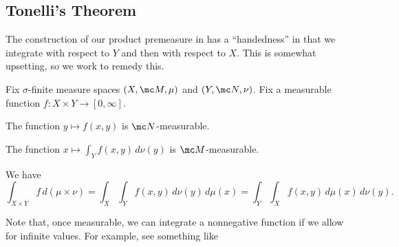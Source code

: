\documentclass[../notes.tex]{subfiles}
\begin{document}
\subsection{Tonelli's Theorem}
The construction of our product premeasure in  has a ``handedness'' in that we integrate with respect to $Y$ and then with respect to $X$. This is somewhat upsetting, so we work to remedy this.
\begin{theorem}[Tonelli]
	Fix $\sigma$-finite measure spaces $(X,\mc M,\mu)$ and $(Y,\mc N,\nu)$. Fix a measurable function $f\colon X\times Y\to[0,\infty]$.
	\begin{listalph}
		\item The function $y\mapsto f(x,y)$ is $\mc N$-measurable.
		\item The function $x\mapsto\int_Yf(x,y)\,d\nu(y)$ is $\mc M$-measurable.
		\item We have
		\[\int_{X\times Y}f\,d(\mu\times\nu)=\int_X\int_Yf(x,y)\,d\nu(y)\,d\mu(x)=\int_Y\int_Xf(x,y)\,d\mu(x)\,d\nu(y).\]
	\end{listalph}
\end{theorem}
\begin{remark}
	Note that, once measurable, we can integrate a nonnegative function if we allow for infinite values. For example, see something like \cite[Proposition~9.22]{elber-top}
\end{remark}
\end{document}
